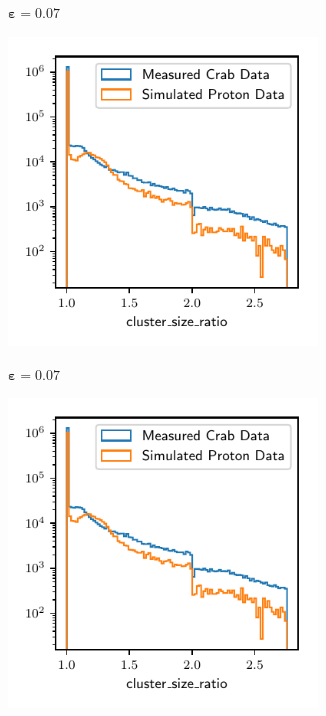 %
\begin{figure}
  \begin{subfigure}{0.5\textwidth}
    \centering
    $\symbf{\varepsilon = 0.07}$\par\smallskip
    \includegraphics[width=0.9\textwidth, page=23]{Plots/Epsilon/07_comparison.pdf}
  \end{subfigure}
  \begin{subfigure}{0.5\textwidth}
    \centering
    $\symbf{\varepsilon = 0.07}$\par\smallskip
    \includegraphics[width=0.9\textwidth, page=2]{Plots/Epsilon/07_comparison.pdf}

\end{subfigure}
\end{figure}

